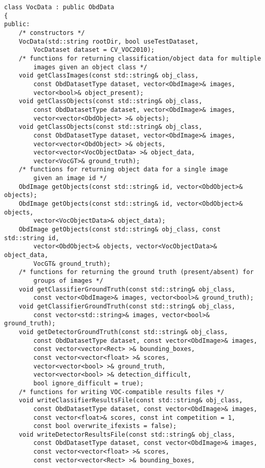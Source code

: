 \begin{lstlisting}
class VocData : public ObdData
{
public:
    /* constructors */
    VocData(std::string rootDir, bool useTestDataset,
        VocDataset dataset = CV_VOC2010);
    /* functions for returning classification/object data for multiple
        images given an object class */
    void getClassImages(const std::string& obj_class,
        const ObdDatasetType dataset, vector<ObdImage>& images,
        vector<bool>& object_present);
    void getClassObjects(const std::string& obj_class,
        const ObdDatasetType dataset, vector<ObdImage>& images,
        vector<vector<ObdObject> >& objects);
    void getClassObjects(const std::string& obj_class,
        const ObdDatasetType dataset, vector<ObdImage>& images,
        vector<vector<ObdObject> >& objects,
        vector<vector<VocObjectData> >& object_data,
        vector<VocGT>& ground_truth);
    /* functions for returning object data for a single image
        given an image id */
    ObdImage getObjects(const std::string& id, vector<ObdObject>& objects);
    ObdImage getObjects(const std::string& id, vector<ObdObject>& objects,
        vector<VocObjectData>& object_data);
    ObdImage getObjects(const std::string& obj_class, const std::string id,
        vector<ObdObject>& objects, vector<VocObjectData>& object_data,
        VocGT& ground_truth);
    /* functions for returning the ground truth (present/absent) for
        groups of images */
    void getClassifierGroundTruth(const std::string& obj_class,
        const vector<ObdImage>& images, vector<bool>& ground_truth);
    void getClassifierGroundTruth(const std::string& obj_class,
        const vector<std::string>& images, vector<bool>& ground_truth);
    void getDetectorGroundTruth(const std::string& obj_class,
        const ObdDatasetType dataset, const vector<ObdImage>& images,
        const vector<vector<Rect> >& bounding_boxes,
        const vector<vector<float> >& scores,
        vector<vector<bool> >& ground_truth,
        vector<vector<bool> >& detection_difficult,
        bool ignore_difficult = true);
    /* functions for writing VOC-compatible results files */
    void writeClassifierResultsFile(const std::string& obj_class,
        const ObdDatasetType dataset, const vector<ObdImage>& images,
        const vector<float>& scores, const int competition = 1,
        const bool overwrite_ifexists = false);
    void writeDetectorResultsFile(const std::string& obj_class,
        const ObdDatasetType dataset, const vector<ObdImage>& images,
        const vector<vector<float> >& scores,
        const vector<vector<Rect> >& bounding_boxes,

\end{lstlisting}
